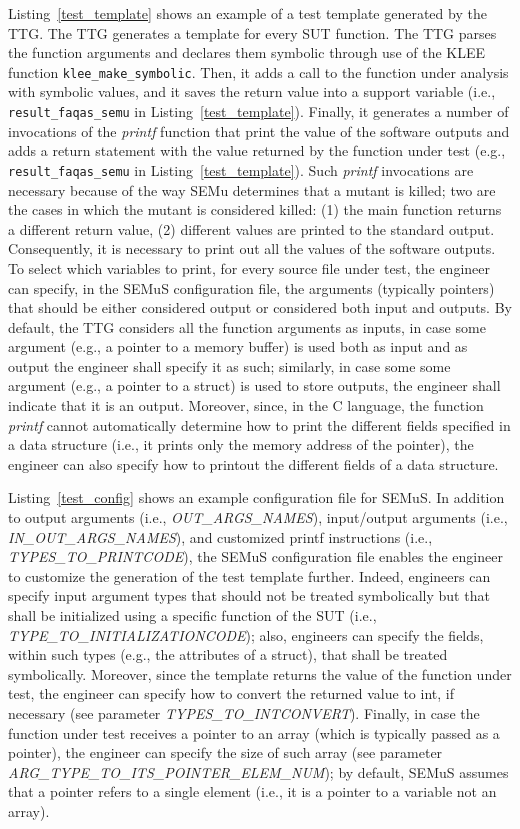 Listing~\ref{test_template} shows an example of a test template generated by the TTG. The TTG generates a template for every SUT function. The TTG parses the function arguments and declares them symbolic through use of the KLEE function \texttt{klee\_make\_symbolic}. Then, it adds a call to the function under analysis with symbolic values, and it saves the return value into a support variable (i.e., \texttt{result\_faqas\_semu} in Listing~\ref{test_template}). Finally, it generates a number of invocations of the \emph{printf} function that print the value of the software outputs and adds a return statement with the value returned by the function under test (e.g., \texttt{result\_faqas\_semu} in Listing~\ref{test_template}). 
Such \emph{printf} invocations are necessary because of the way SEMu determines that a mutant is killed; two are the cases in which the mutant is considered killed: (1) the main function returns a different return value, (2) different values are printed to the standard output. Consequently, it is necessary to print out all the values of the software outputs.
To select which variables to print, for every source file under test, the engineer can specify, in the SEMuS configuration file, the arguments (typically pointers) that should be either considered output or considered both input and outputs. By default, the TTG considers all the function arguments as inputs, in case some argument (e.g., a pointer to a memory buffer) is used both as input and as output the engineer shall specify it as such; similarly, in case some some argument (e.g., a pointer to a struct) is used to store outputs, the engineer shall indicate that it is an output. Moreover, since, in  the C language, the function \emph{printf} cannot automatically determine how to print the different fields specified in a data structure (i.e., it prints only the memory address of the pointer), the engineer can also specify how to printout the different fields of a data structure.

Listing~\ref{test_config} shows an example configuration file for SEMuS. In addition to output arguments (i.e., \emph{OUT\_\-ARGS\_NAMES}), input/output arguments (i.e., \emph{IN\_OUT\_ARGS\_NAMES}), and customized printf instructions (i.e., \emph{TYPES\_TO\_PRINTCODE}), the SEMuS configuration file enables the engineer to customize the generation of the test template further. Indeed, engineers can specify input argument types that should not be treated symbolically but that shall be initialized using a specific function of the SUT (i.e., \emph{TYPE\_TO\_INITIALIZATION\-CODE}); also, engineers can specify the fields, within such types (e.g., the attributes of a struct), that shall be treated symbolically.
Moreover, since the template returns the value of the function under test, the engineer can specify how to convert the returned value to int, if necessary (see parameter \emph{TYPES\_TO\_INTCONVERT}). Finally, in case the function under test receives a pointer to an array (which is typically passed as a pointer), the engineer can specify the size of such array (see parameter \emph{ARG\_TYPE\_TO\_ITS\_POINTER\_ELEM\_NUM}); by default, SEMuS assumes that a pointer refers to a single element (i.e., it is a pointer to a variable not an array).  


